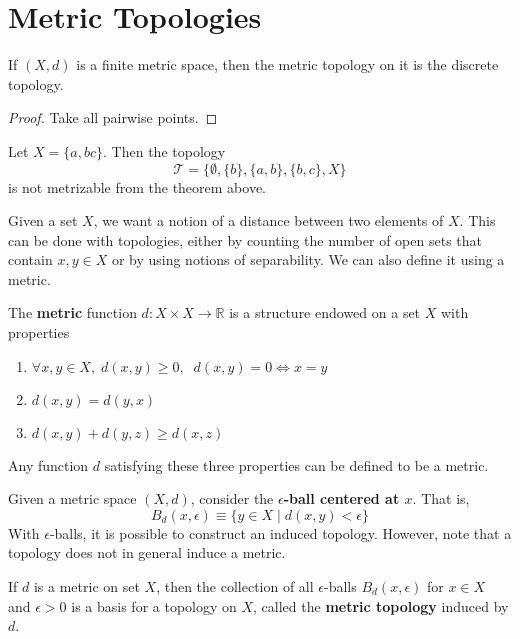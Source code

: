 \section{Metric Topologies}

  \begin{theorem}
    If $(X, d)$ is a finite metric space, then the metric topology on it is the discrete topology. 
  \end{theorem}
  \begin{proof}
    Take all pairwise points. 
  \end{proof}

  \begin{example}
    Let $X = \{a, b c\}$. Then the topology 
    \begin{equation}
      \mathscr{T} = \{\emptyset, \{b\}, \{a, b\}, \{b, c\}, X \}
    \end{equation} 
    is not metrizable from the theorem above. 
  \end{example}


  Given a set $X$, we want a notion of a distance between two elements of $X$. This can be done with topologies, either by counting the number of open sets that contain $x, y \in X$ or by using notions of separability. We can also define it using a metric. 

  \begin{definition}
  The \textbf{metric} function $d: X \times X \longrightarrow \mathbb{R}$ is a structure endowed on a set $X$ with properties 
  \begin{enumerate}
      \item $\forall x, y \in X, \; d(x, y) \geq 0, \; \; d(x, y) = 0 \iff x = y$
      \item $d(x, y) = d(y, x)$ 
      \item $d(x, y) + d(y, z) \geq d(x, z)$
  \end{enumerate}
  Any function $d$ satisfying these three properties can be defined to be a metric. 
  \end{definition}

  Given a metric space $(X, d)$, consider the \textbf{$\epsilon$-ball centered at $x$}. That is, 
  \[B_d (x, \epsilon) \equiv \{y \in X \; | \; d(x, y) < \epsilon\}\]
  With $\epsilon$-balls, it is possible to construct an induced topology. However, note that a topology does not in general induce a metric. 

  \begin{definition}
  If $d$ is a metric on set $X$, then the collection of all $\epsilon$-balls $B_d (x, \epsilon)$ for $x \in X$ and $\epsilon > 0$ is a basis for a topology on $X$, called the \textbf{metric topology} induced by $d$. 
  \end{definition}

